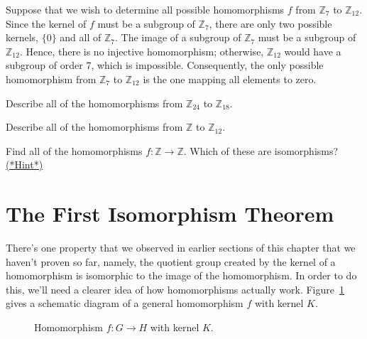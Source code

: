 \begin{example}\label{example:homomorph:homo_Z7}
Suppose that we wish to determine all possible homomorphisms $f$
from ${\mathbb Z}_7$ to  ${\mathbb Z}_{12}$. Since the kernel of $f$ must
be a subgroup of  ${\mathbb Z}_7$, there are only two possible
kernels, $\{ 0 \}$ and all of ${\mathbb Z}_7$.  The image of a subgroup
of ${\mathbb Z}_7$ must be a subgroup of ${\mathbb Z}_{12}$. Hence, there is
no injective homomorphism; otherwise, ${\mathbb Z}_{12}$ would have a
subgroup of order 7, which is impossible. Consequently, the only
possible homomorphism from ${\mathbb Z}_7$ to  ${\mathbb Z}_{12}$ is the one
mapping all elements to zero. 
\end{example}

\begin{exercise}
Describe all of the homomorphisms from ${\mathbb Z}_{24}$ to ${\mathbb
Z}_{18}$. 
\end{exercise} 
 
\begin{exercise}
Describe all of the homomorphisms from ${\mathbb Z}$ to ${\mathbb Z}_{12}$. 
\end{exercise} 

\begin{exercise}\label{exercise:homomorph:allhom}
Find all of the homomorphisms $f : {\mathbb Z} \rightarrow {\mathbb Z}$.
Which of these are isomorphisms?
\hyperref[sec:homomorph:hints]{(*Hint*)} 
\end{exercise} 

 
\section{The First Isomorphism Theorem}
\label{sec:FirstIsomorphismTheorem}
 
There's one property that we observed in earlier sections of this chapter that we haven't proven so far, namely,  the quotient group created by the kernel of a homomorphism is isomorphic to the image of the homomorphism.  In order to do this, we'll need a clearer idea of how homomorphisms actually work. Figure~\ref{fig:homomorph3} gives a schematic diagram of a general homomorphism $f$ with kernel $K$. 
\begin{figure}[htb]
	  \caption{\label{fig:homomorph3} Homomorphism $f:G \rightarrow H$ with kernel $K$. }
\end{figure}


